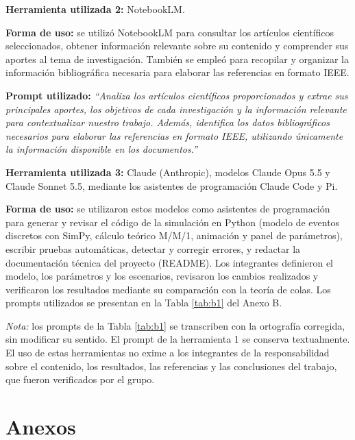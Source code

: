 \documentclass[conference,a4paper]{IEEEtran}
\begin{document}
\medskip
\noindent\textbf{Herramienta utilizada 2:} NotebookLM.

\noindent\textbf{Forma de uso:} se utilizó NotebookLM para consultar los artículos científicos
seleccionados, obtener información relevante sobre su contenido y comprender sus aportes al
tema de investigación. También se empleó para recopilar y organizar la información
bibliográfica necesaria para elaborar las referencias en formato IEEE.

\noindent\textbf{Prompt utilizado:} \textit{``Analiza los artículos científicos
proporcionados y extrae sus principales aportes, los objetivos de cada investigación y la
información relevante para contextualizar nuestro trabajo. Además, identifica los datos
bibliográficos necesarios para elaborar las referencias en formato IEEE, utilizando
únicamente la información disponible en los documentos.''}

\medskip
\noindent\textbf{Herramienta utilizada 3:} Claude (Anthropic), modelos Claude Opus 5.5 y
Claude Sonnet 5.5, mediante los asistentes de programación Claude Code y Pi.

\noindent\textbf{Forma de uso:} se utilizaron estos modelos como asistentes de programación
para generar y revisar el código de la simulación en Python (modelo de eventos discretos con
SimPy, cálculo teórico M/M/1, animación y panel de parámetros), escribir pruebas
automáticas, detectar y corregir errores, y redactar la documentación técnica del proyecto
(README). Los integrantes definieron el modelo, los parámetros y los escenarios, revisaron
los cambios realizados y verificaron los resultados mediante su comparación con la teoría de
colas. Los prompts utilizados se presentan en la Tabla \ref{tab:b1} del Anexo B.

\medskip
\noindent\textit{Nota:} los prompts de la Tabla \ref{tab:b1} se transcriben con la ortografía
corregida, sin modificar su sentido. El prompt de la herramienta 1 se conserva textualmente.
El uso de estas herramientas no exime a los integrantes de la responsabilidad sobre el
contenido, los resultados, las referencias y las conclusiones del trabajo, que fueron
verificados por el grupo.

\onecolumn
\section*{Anexos}
\end{document}
